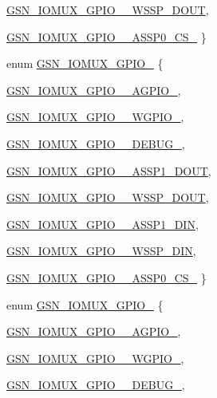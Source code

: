 \begin{DoxyCompactItemize}
\par
\hyperlink{a00519_a44939fa9f5f560069cce43fb9e7583f1a86115959035c4d7bf62bf3223998d42b}{GSN\_\-IOMUX\_\-GPIO\_\_\-WSSP\_\-DOUT}, 
\par
\hyperlink{a00519_a44939fa9f5f560069cce43fb9e7583f1a41c541f114c1590809636a046d521716}{GSN\_\-IOMUX\_\-GPIO\_\_\-ASSP0\_\-CS\_}
 \}
\item 
enum \hyperlink{a00519_a50dbf41b8db41ae657f19b8445053a72}{GSN\_\-IOMUX\_\-GPIO\_} \{ \par
\hyperlink{a00519_a50dbf41b8db41ae657f19b8445053a72a999ca28fefa067d5f39abc401efa1634}{GSN\_\-IOMUX\_\-GPIO\_\_\-AGPIO\_}, 
\par
\hyperlink{a00519_a50dbf41b8db41ae657f19b8445053a72a79dced669f7a93716c9fc997537a9c17}{GSN\_\-IOMUX\_\-GPIO\_\_\-WGPIO\_}, 
\par
\hyperlink{a00519_a50dbf41b8db41ae657f19b8445053a72a3a588850fe9d8b0fc9e9dba8c46faf3e}{GSN\_\-IOMUX\_\-GPIO\_\_\-DEBUG\_}, 
\par
\hyperlink{a00519_a50dbf41b8db41ae657f19b8445053a72ac4fec5a33d8d06d1413f7fc0c491da20}{GSN\_\-IOMUX\_\-GPIO\_\_\-ASSP1\_\-DOUT}, 
\par
\hyperlink{a00519_a50dbf41b8db41ae657f19b8445053a72a174635705a6f5a06095424256c143742}{GSN\_\-IOMUX\_\-GPIO\_\_\-WSSP\_\-DOUT}, 
\par
\hyperlink{a00519_a50dbf41b8db41ae657f19b8445053a72a78b7d81972f81425f834327c7756e180}{GSN\_\-IOMUX\_\-GPIO\_\_\-ASSP1\_\-DIN}, 
\par
\hyperlink{a00519_a50dbf41b8db41ae657f19b8445053a72aa87a0db2f59871bbef7cd185dc075e5c}{GSN\_\-IOMUX\_\-GPIO\_\_\-WSSP\_\-DIN}, 
\par
\hyperlink{a00519_a50dbf41b8db41ae657f19b8445053a72ae038785b2daff619d40825aceded94f9}{GSN\_\-IOMUX\_\-GPIO\_\_\-ASSP0\_\-CS\_}
 \}
\item 
enum \hyperlink{a00519_ab7d7b1750ad31046bc7faa198b81cbc8}{GSN\_\-IOMUX\_\-GPIO\_} \{ \par
\hyperlink{a00519_ab7d7b1750ad31046bc7faa198b81cbc8a6f1e30dbb6eb86470d79704fc344a380}{GSN\_\-IOMUX\_\-GPIO\_\_\-AGPIO\_}, 
\par
\hyperlink{a00519_ab7d7b1750ad31046bc7faa198b81cbc8a4b77de699a05ae9709273f4407a909e4}{GSN\_\-IOMUX\_\-GPIO\_\_\-WGPIO\_}, 
\par
\hyperlink{a00519_ab7d7b1750ad31046bc7faa198b81cbc8a8c7867c5084e303012b1c261aa5c6d27}{GSN\_\-IOMUX\_\-GPIO\_\_\-DEBUG\_}, 
\par

\end{DoxyCompactItemize}
